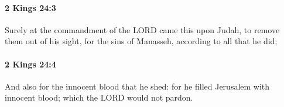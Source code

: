 		\paragraph{2 Kings 24:3} %
			\label{2KINGS-24-3}

			Surely at the commandment of the LORD came this upon Judah, to remove them out of his sight, for the sins of Manasseh, according to all that he did;


		\paragraph{2 Kings 24:4} %
			\label{2KINGS-24-4}

			And also for the innocent blood that he shed: for he filled Jerusalem with innocent blood; which the LORD would not pardon.


